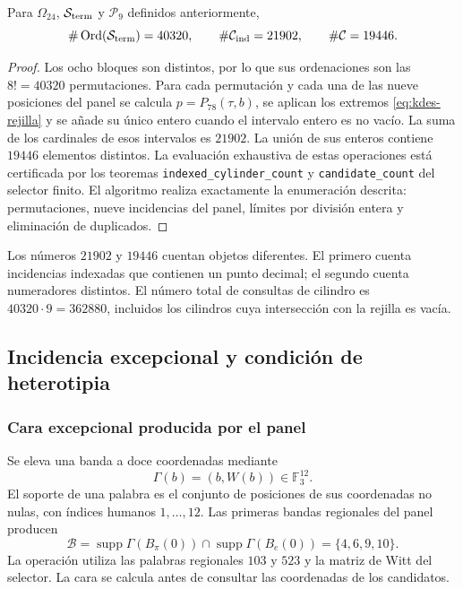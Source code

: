 \begin{proposition}
Para $\Omega_{24}$, $\mathcal S_{\rm term}$ y $\mathcal P_9$
definidos anteriormente,
\[
 \#\operatorname{Ord}(\mathcal S_{\rm term})=40320,
 \qquad\#\mathcal C_{\rm ind}=21902,
 \qquad\#\mathcal C=19446.
\]
\end{proposition}
\begin{proof}
Los ocho bloques son distintos, por lo que sus ordenaciones son las
$8!=40320$ permutaciones. Para cada permutación y cada una de las
nueve posiciones del panel se calcula $p=P_{78}(\tau,b)$, se aplican
los extremos \eqref{eq:kdes-rejilla} y se añade su único entero cuando
el intervalo entero es no vacío. La suma de los cardinales de esos
intervalos es $21902$. La unión de sus enteros contiene $19446$
elementos distintos. La evaluación exhaustiva de estas operaciones
está certificada por los teoremas
\texttt{indexed\_cylinder\_count} y \texttt{candidate\_count} del
selector finito. El algoritmo realiza exactamente la enumeración
descrita: permutaciones, nueve incidencias del panel, límites por
división entera y eliminación de duplicados.
\end{proof}

Los números $21902$ y $19446$ cuentan objetos diferentes. El primero
cuenta incidencias indexadas que contienen un punto decimal; el segundo
cuenta numeradores distintos. El número total de consultas de cilindro
es $40320\cdot9=362880$, incluidos los cilindros cuya intersección con
la rejilla es vacía.

\subsection{Incidencia excepcional y condición de heterotipia}

\subsubsection{Cara excepcional producida por el panel}

Se eleva una banda a doce coordenadas mediante
\[
 \Gamma(b)=(b,W(b))\in\mathbb F_3^{12}.
\]
El soporte de una palabra es el conjunto de posiciones de sus
coordenadas no nulas, con índices humanos $1,\ldots,12$. Las primeras
bandas regionales del panel producen
\begin{equation}
 \mathcal B=\operatorname{supp}\Gamma(B_\pi(0))
          \cap\operatorname{supp}\Gamma(B_e(0))
          =\{4,6,9,10\}.
 \label{eq:kdes-cara}
\end{equation}
La operación utiliza las palabras regionales $103$ y $523$ y la
matriz de Witt del selector. La cara se calcula antes de consultar las
coordenadas de los candidatos.

